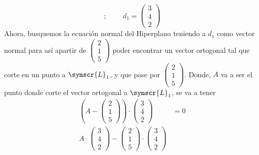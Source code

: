 \documentclass{article}
\def\fancyL{\symscr{L}}
\begin{document}
\begin{enumerate}
\[            \text{;}
            \hspace{1cm}
            d_1 = 
            \begin{pmatrix}
                3 \\ 4 \\ 2
            \end{pmatrix}
        \]
        Ahora, busquemos la ecuación normal del Hiperplano teniendo a \(d_1\) como vector normal para así apartir de \(\left(\begin{smallmatrix}2 \\ 1 \\ 5\end{smallmatrix}\right)\)
        poder encontrar un vector ortogonal tal que corte en un punto a \(\fancyL_1\), y que pase por \(\left(\begin{smallmatrix}2 \\ 1 \\ 5\end{smallmatrix}\right)\). 
        Donde, \(A\) va a ser el punto donde corte el vector ortogonal a \(\fancyL_1\), se va a tener
        \[
            \begin{aligned}
                \left(
                    A 
                    - 
                    \begin{pmatrix}
                        2 \\ 1 \\ 5 
                    \end{pmatrix}
                \right)
                \cdot 
                \begin{pmatrix}
                    3 \\ 4 \\ 2
                \end{pmatrix}
                &= 0 \\
                    A 
                \cdot 
                \begin{pmatrix}
                    3 \\ 4 \\ 2
                \end{pmatrix}
                -
                \begin{pmatrix}
                    2 \\ 1 \\ 5 
                \end{pmatrix}
                \cdot 
                \begin{pmatrix}
                    3 \\ 4 \\ 2

\end{pmatrix}
\end{aligned}\]
\end{enumerate}
\end{document}
